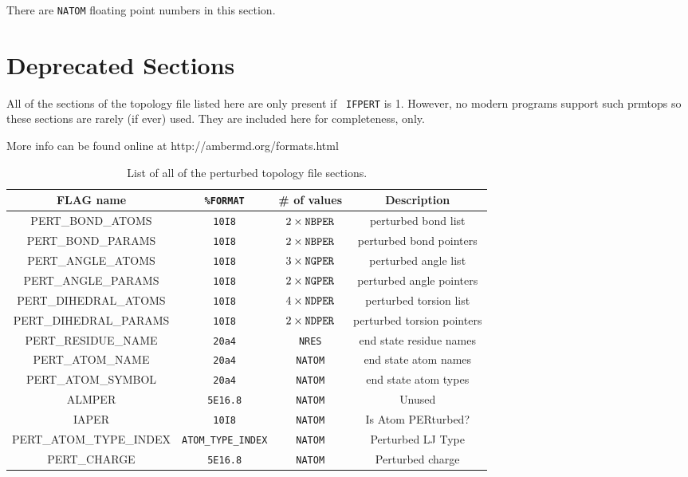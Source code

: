 \noindent There are {\tt NATOM} floating point numbers in this section.


\section{Deprecated Sections}

All of the sections of the topology file listed here are only present if {\tt
IFPERT} is 1. However, no modern programs support such prmtops so these sections
are rarely (if ever) used. They are included here for completeness, only.

More info can be found online at http://ambermd.org/formats.html

\begin{table*}
   \caption{List of all of the perturbed topology file sections.}
   \begin{tabular}{|c|c|c|c|}
      \hline
      FLAG name & {\tt \%FORMAT} & # of values & Description \\
      \hline
      PERT\_BOND\_ATOMS & {\tt 10I8} &  $2 \times {\tt NBPER}$ & perturbed bond
         list \\
      PERT\_BOND\_PARAMS & {\tt 10I8} & $2 \times {\tt NBPER}$ & perturbed bond
         pointers \\
      PERT\_ANGLE\_ATOMS & {\tt 10I8} & $3 \times {\tt NGPER}$ & perturbed angle
         list \\
      PERT\_ANGLE\_PARAMS & {\tt 10I8} & $2 \times {\tt NGPER}$ & perturbed
         angle pointers \\
      PERT\_DIHEDRAL\_ATOMS & {\tt 10I8} & $4 \times {\tt NDPER}$ & perturbed
         torsion list \\
      PERT\_DIHEDRAL\_PARAMS & {\tt 10I8} & $2 \times {\tt NDPER}$ & perturbed
         torsion pointers \\
      PERT\_RESIDUE\_NAME & {\tt 20a4} & {\tt NRES} & end state residue names \\
      PERT\_ATOM\_NAME & {\tt 20a4} & {\tt NATOM} & end state atom names \\
      PERT\_ATOM\_SYMBOL & {\tt 20a4} & {\tt NATOM} & end state atom types \\
      ALMPER & {\tt 5E16.8} & {\tt NATOM} & Unused \\
      IAPER & {\tt 10I8} & {\tt NATOM} & Is Atom PERturbed? \\
      PERT\_ATOM\_TYPE\_INDEX & {\tt ATOM\_TYPE\_INDEX} & {\tt NATOM} &
         Perturbed LJ Type \\
      PERT\_CHARGE & {\tt 5E16.8} & {\tt NATOM} & Perturbed charge \\
      \hline
   \end{tabular}
\end{table*}
